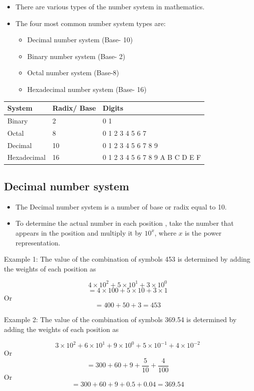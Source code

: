 \documentclass[]{book}
\providecommand{\tightlist}{%
  \setlength{\itemsep}{0pt}\setlength{\parskip}{0pt}}
\begin{document}
\begin{itemize}
\item
  There are various types of the number system in mathematics.
\item
  The four most common number system types are:

  \begin{itemize}
  \tightlist
  \item
    Decimal number system (Base- 10)
  \item
    Binary number system (Base- 2)
  \item
    Octal number system (Base-8)
  \item
    Hexadecimal number system (Base- 16)
  \end{itemize}
\end{itemize}

\begin{longtable}[]{@{}lll@{}}
\toprule
System & Radix/ Base & Digits\tabularnewline
\midrule
\endhead
Binary & 2 & 0 1\tabularnewline
Octal & 8 & 0 1 2 3 4 5 6 7\tabularnewline
Decimal & 10 & 0 1 2 3 4 5 6 7 8 9\tabularnewline
Hexadecimal & 16 & 0 1 2 3 4 5 6 7 8 9 A B C D E F\tabularnewline
\bottomrule
\end{longtable}

\hypertarget{decimal-number-system}{%
\subsection{Decimal number system}\label{decimal-number-system}}

\begin{itemize}
\item
  The Decimal number system is a number of base or radix equal to 10.
\item
  To determine the actual number in each position , take the number that appears in the position and multiply it by \(10^x\), where \(x\) is the power representation.
\end{itemize}

Example 1: The value of the combination of symbols 453 is determined by adding the weights of each position as

\[4\times10^2+5\times10^1+3\times10^0\]
\[= 4\times100 + 5\times10+3\times1\]
Or \[= 400+50+3 = 453\]

Example 2: The value of the combination of symbols 369.54 is determined by adding the weights of each position as

\[3\times10^2+6\times10^1+9\times10^0+5\times10^{-1}+4\times10^{-2}\]
Or \[= 300 + 60+9+\frac{5}{10}+\frac{4}{100}\]
Or \[= 300 + 60+9+0.5+0.04= 369.54\]
\end{document}
